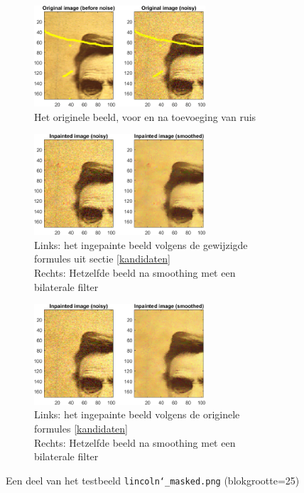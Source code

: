 \documentclass[titlepage]{article}
\begin{document}
\begin{figure}[H]
\centering
\begin{subfigure}[b]{\linewidth}
	\centering
    \captionsetup{justification=centering}
    \includegraphics[width=0.7\textwidth]{lincoln_medium_original}
    \caption{Het originele beeld, voor en na toevoeging van ruis}
\end{subfigure}

\begin{subfigure}[b]{\linewidth}
	\centering
    \captionsetup{justification=centering}
    \includegraphics[width=0.7\textwidth]{lincoln_medium_msdsmoothed}
    \caption{Links: het ingepainte beeld volgens de gewijzigde formules uit sectie \ref{kandidaten}\\Rechts: Hetzelfde beeld na smoothing met een bilaterale filter}
\end{subfigure}

\begin{subfigure}[b]{\linewidth}
	\centering
    \captionsetup{justification=centering}
    \includegraphics[width=0.7\textwidth]{lincoln_medium_unsmoothed}
    \caption{Links: het ingepainte beeld volgens de originele formules \ref{kandidaten}\\Rechts: Hetzelfde beeld na smoothing met een bilaterale filter}
\end{subfigure}
\caption{Een deel van het testbeeld \texttt{lincoln\char`_masked.png} (blokgrootte=25)} \label{fig:lincoln_medium}
\end{figure}
\end{document}
